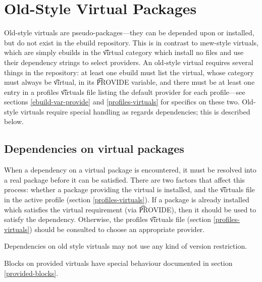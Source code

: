 \chapter{Old-Style Virtual Packages}
\label{old-virtuals}

Old-style virtuals are pseudo-packages---they can be depended upon or installed, but do not exist
in the ebuild repository. This is in contrast to \i{new-style} virtuals, which are simply ebuilds in
the \t{virtual} category which install no files and use their dependency strings to select
providers. An old-style virtual requires several things in the repository: at least
one ebuild must list the virtual, whose category must always be \t{virtual}, in its \t{PROVIDE}
variable, and there must be at least one entry in a profiles \t{virtuals} file listing the default
provider for each profile---see sections \ref{ebuild-var-provide} and \ref{profiles-virtuals} for
specifics on these two. Old-style virtuals require special handling as regards dependencies; this is
described below.

\section{Dependencies on virtual packages}

When a dependency on a virtual package is encountered, it must be resolved into a real package
before it can be satisfied. There are two factors that affect this process: whether a package
providing the virtual is installed, and the \t{virtuals} file in the active profile (section
\ref{profiles-virtuals}). If a package is already installed which satisfies the virtual requirement
(via \t{PROVIDE}), then it should be used to satisfy the dependency. Otherwise, the profiles
\t{virtuals} file (section \ref{profiles-virtuals}) should be consulted to choose an appropriate
provider.

Dependencies on old style virtuals may not use any kind of version restriction.

Blocks on provided virtuals have special behaviour documented in section \ref{provided-blocks}.

